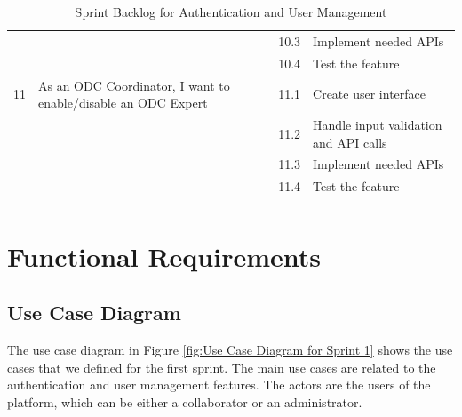 \begin{longtable}{|p{1cm}|p{7cm}|p{1cm}|p{7cm}|}
                                    &                                                               & 10.3        & Implement needed APIs                 \\ \cline{3-4}
                                    &                                                               & 10.4        & Test the feature                      \\ \hline
    11                              & As an ODC Coordinator, I want to enable/disable an ODC Expert & 11.1        & Create user interface                 \\ \cline{3-4}
                                    &                                                               & 11.2        & Handle input validation and API calls \\ \cline{3-4}
                                    &                                                               & 11.3        & Implement needed APIs                 \\ \cline{3-4}
                                    &                                                               & 11.4        & Test the feature                      \\ \hline
    \caption{Sprint Backlog for Authentication and User Management}
    \label{tab:sprint_backlog_auth_user_mgmt}
\end{longtable}


\section{Functional Requirements}
\subsection{Use Case Diagram}
The use case diagram in Figure \ref{fig:Use Case Diagram for Sprint 1} shows the use cases that we defined for the first sprint.
The main use cases are related to the authentication and user management features. The actors are the users of the platform,
which can be either a collaborator or an administrator.

